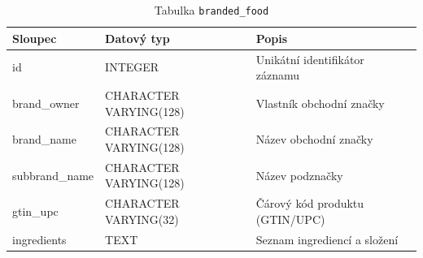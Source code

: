 \begin{table}[ht!]
    \centering
    \begin{tabularx}{\textwidth}{|l|l|L|}
        \hline
        \textbf{Sloupec} & \textbf{Datový typ}    & \textbf{Popis}                 \\ \hline
        id               & INTEGER                & Unikátní identifikátor záznamu \\ \hline
        brand\_owner     & CHARACTER VARYING(128) & Vlastník obchodní značky       \\ \hline
        brand\_name      & CHARACTER VARYING(128) & Název obchodní značky          \\ \hline
        subbrand\_name   & CHARACTER VARYING(128) & Název podznačky                \\ \hline
        gtin\_upc        & CHARACTER VARYING(32)  & Čárový kód produktu (GTIN/UPC) \\ \hline
        ingredients      & TEXT                   & Seznam ingrediencí a složení   \\ \hline
    \end{tabularx}
    \caption{Tabulka \texttt{branded\_food}}
    \label{tab:branded_food}
\end{table}

